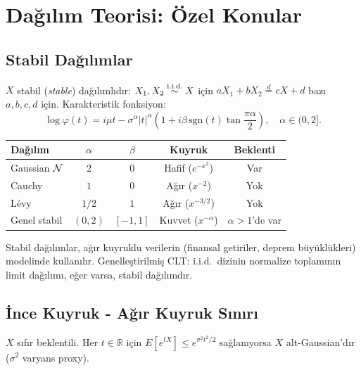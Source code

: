 \section{Dağılım Teorisi: Özel Konular}
\label{app:ozel_dagilim}

\subsection{Stabil Dağılımlar}

\begin{tanim}\label{def:stabil}
$X$ stabil (\emph{stable}) dağılımlıdır: $X_1,X_2\overset{\text{i.i.d.}}{\sim} X$ için $aX_1+bX_2\overset{d}{=}cX+d$ bazı $a,b,c,d$ için. Karakteristik fonksiyon:
\[
  \log\varphi(t) = i\mu t - \sigma^\alpha|t|^\alpha\left(1+i\beta\,\mathrm{sgn}(t)\tan\frac{\pi\alpha}{2}\right), \quad \alpha\in(0,2].
\]
\end{tanim}

\begin{center}
\renewcommand{\arraystretch}{1.5}
\small
\begin{tabular}{p{3cm}cccc}
\hline
\textbf{Dağılım} & $\alpha$ & $\beta$ & \textbf{Kuyruk} & \textbf{Beklenti} \\
\hline
Gaussian $\mathcal{N}$ & $2$ & $0$ & Hafif ($e^{-x^2}$) & Var \\
Cauchy & $1$ & $0$ & Ağır ($x^{-2}$) & Yok \\
Lévy & $1/2$ & $1$ & Ağır ($x^{-3/2}$) & Yok \\
Genel stabil & $(0,2)$ & $[-1,1]$ & Kuvvet ($x^{-\alpha}$) & $\alpha>1$'de var \\
\hline
\end{tabular}
\end{center}

Stabil dağılımlar, ağır kuyruklu verilerin (finansal getiriler, deprem büyüklükleri) modelinde kullanılır. Genelleştirilmiş CLT: i.i.d.\ dizinin normalize toplamının limit dağılımı, eğer varsa, stabil dağılımdır.

\subsection{İnce Kuyruk - Ağır Kuyruk Sınırı}

\begin{tanim}\label{def:alt_gaussian}
$X$ sıfır beklentili. Her $t\in\mathbb{R}$ için $E[e^{tX}]\leq e^{\sigma^2t^2/2}$ sağlanıyorsa $X$ alt-Gaussian'dır ($\sigma^2$ varyans proxy).
\end{tanim}

